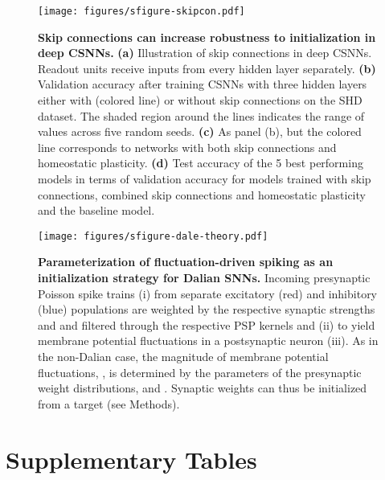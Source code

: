 \documentclass[11pt,a4paper]{article}
\begin{document}
\begin{refsection}
\begin{figure}[htb]
	\texttt{[image: figures/sfigure-skipcon.pdf]}
\caption{\textbf{Skip connections can increase robustness to initialization in deep \acp{CSNN}.}
\textbf{(a)} Illustration of skip connections in deep \acp{CSNN}. Readout units receive inputs from every hidden layer separately.
\textbf{(b)} Validation accuracy after training \acp{CSNN}  with three hidden layers either with (colored line) or without skip connections on the SHD dataset. The shaded region around the lines indicates the range of values across five random seeds. 
\textbf{(c)} As panel (b), but the colored line corresponds to networks with both skip connections and homeostatic plasticity.
\textbf{(d)} Test accuracy of the 5 best performing models in terms of validation accuracy for models trained with skip connections, combined skip connections and homeostatic plasticity and the baseline model. 
}
\label{sfig:skipcon}
\end{figure}

\begin{figure}[htb]
	\texttt{[image: figures/sfigure-dale-theory.pdf]}
\caption{\textbf{Parameterization of fluctuation-driven spiking as an initialization strategy for Dalian \acp{SNN}.}
	Incoming presynaptic Poisson spike trains (i) from separate excitatory (red) and inhibitory (blue) populations are weighted by the respective synaptic strengths  and  and filtered through the respective \ac{PSP} kernels  and  (ii) to yield membrane potential fluctuations  in a postsynaptic neuron (iii). As in the non-Dalian case, the magnitude of membrane potential fluctuations, , is determined by the parameters of the presynaptic weight distributions,  and . Synaptic weights can thus be initialized from a target  (see Methods).
}
\label{sfig:dale-theory}
\end{figure} 
\clearpage
\section*{Supplementary Tables}




\end{refsection}
\end{document}
